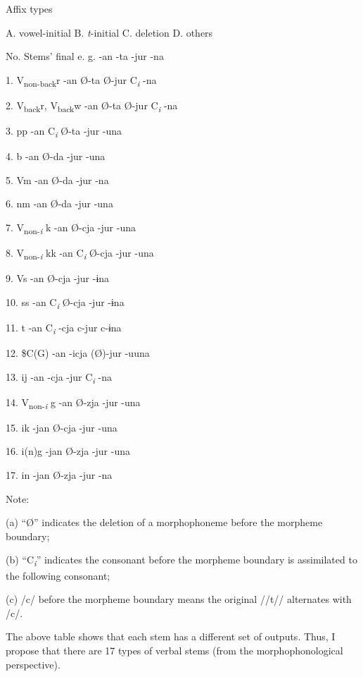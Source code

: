     Affix types

    A. vowel-initial  B. \textit{t}{}-initial  C. deletion  D. others

No.  Stems’ final  e. g.  {}-an  {}-ta  {}-jur  {}-na

1.  V\textsubscript{non-back}r    {}-an  Ø-ta  Ø-jur  C\textit{\textsubscript{i} }{}-na

2.  V\textsubscript{back}r, V\textsubscript{back}w    {}-an  Ø-ta  Ø-jur  C\textit{\textsubscript{i} }{}-na

3.  pp    {}-an  C\textit{\textsubscript{i} }Ø-ta  {}-jur  {}-una

4.  b    {}-an  Ø-da  {}-jur  {}-una

5.  Vm    {}-an  Ø-da  {}-jur  {}-na

6.  nm    {}-an  Ø-da  {}-jur  {}-una

7.  V\textsubscript{non-}\textit{\textsubscript{i}} k    {}-an  Ø-cja  {}-jur  {}-una

8.  V\textsubscript{non-}\textit{\textsubscript{i}} kk    {}-an  C\textit{\textsubscript{i} }Ø-cja  {}-jur  {}-una

9.  Vs    {}-an  Ø-cja  {}-jur  {}-ɨna

10.  ss    {}-an  C\textit{\textsubscript{i} }Ø-cja  {}-jur  {}-ɨna

11.  t    {}-an  C\textit{\textsubscript{i} }{}-cja  c-jur  c-ɨna

12.  \$C(G)    {}-an  {}-icja  (Ø)-jur  {}-uuna

13.  ij    {}-an  {}-cja  {}-jur  C\textit{\textsubscript{i} }{}-na

14.  V\textsubscript{non-}\textit{\textsubscript{i} }g    {}-an  Ø-zja  {}-jur  {}-una

15.  ik    {}-jan  Ø-cja  {}-jur  {}-una

16.  i(n)g    {}-jan  Ø-zja  {}-jur  {}-una

17.  in    {}-jan  Ø-zja  {}-jur  {}-na

Note:

(a) “Ø” indicates the deletion of a morphophoneme before the morpheme boundary;

(b) “C\textit{\textsubscript{i}}” indicates the consonant before the morpheme boundary is assimilated to the following consonant;

(c) /c/ before the morpheme boundary means the original //t// alternates with /c/.

The above table shows that each stem has a different set of outputs. Thus, I propose that there are 17 types of verbal stems (from the morphophonological perspective).

